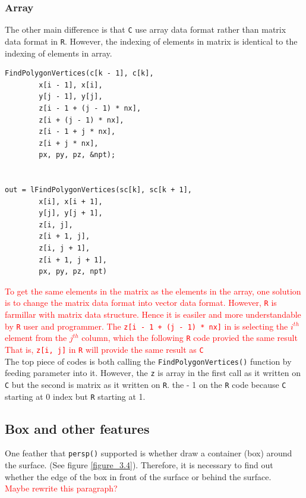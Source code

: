 \documentclass[paper=a4, fontsize=11pt]{report}
\begin{document}
\subsubsection{Array}
The other main difference is that \texttt{C} use array data format rather than matrix data format in \texttt{R}. However, the indexing of elements in matrix is identical to the indexing of elements in array. 
\begin{lstlisting}
FindPolygonVertices(c[k - 1], c[k],
        x[i - 1], x[i],
        y[j - 1], y[j],
        z[i - 1 + (j - 1) * nx],
        z[i + (j - 1) * nx],
        z[i - 1 + j * nx],
        z[i + j * nx],
        px, py, pz, &npt);
	    

out = lFindPolygonVertices(sc[k], sc[k + 1],
        x[i], x[i + 1],
        y[j], y[j + 1],
        z[i, j],
        z[i + 1, j],
        z[i, j + 1],
        z[i + 1, j + 1],
        px, py, pz, npt)
\end{lstlisting}

\textcolor{red}{
To get the same elements in the matrix as the elements in the array, one solution is to change the matrix data format into vector data format. However, \texttt{R} is farmillar with matrix data structure. Hence it is easiler and more understandable by \texttt{R} user and programmer. The \texttt{z[i - 1 + (j - 1) * nx]} in  is selecting the $i^{th}$ element from the $j^{th}$ column, which the following \texttt{R} code provied the same result That is, \texttt{z[i, j]} in \texttt{R} will provide the same result as \texttt{C}
}\\


The top piece of codes is both calling the \texttt{FindPolygonVertices()} function by feeding parameter into it. However, the \texttt{z} is array in the first call as it written on \texttt{C} but the second is matrix as it written on \texttt{R}. the - 1 on the \texttt{R} code because \texttt{C} starting at 0 index but \texttt{R} starting at 1.\\

\subsection{Box and other features}
One feather that \texttt{persp()} supported is whether draw a container (box) around the surface. (See figure \ref{figure_3.4}). Therefore, it is necessary to find out whether the edge of the box in front of the surface or behind the surface. \\ 
\textcolor{red}{Maybe rewrite this paragraph?} \\
\end{document}
